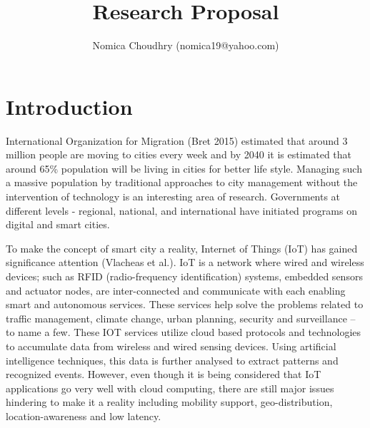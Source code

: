 \documentclass[10pt]{llncs}
\begin{document}
%
\title{Research Proposal}
%
\author{
Nomica Choudhry (\selectfont\ttfamily\upshape nomica19@yahoo.com)\\
}
\maketitle

%
\section{Introduction}
International Organization for Migration (Bret 2015) estimated that around 3 million people are moving to cities every week and by 2040 it is estimated that around 65\% population will be living in cities for better life style. Managing such a massive population by traditional approaches to city management without the intervention of technology is an interesting area of research. Governments at different levels - regional, national, and international have initiated programs on digital and smart cities.

To make the concept of smart city a reality, Internet of Things (IoT) has gained significance attention (Vlacheas et al.). IoT is a network where wired and wireless devices; such as RFID (radio-frequency identification) systems, embedded sensors and actuator nodes, are inter-connected and communicate with each enabling smart and autonomous services. These services help solve the problems related to traffic management, climate change, urban planning, security and surveillance – to name a few. These IOT services utilize cloud based protocols and technologies to accumulate data from wireless and wired sensing devices. Using artificial intelligence techniques, this data is further analysed to extract patterns and recognized events. However, even though it is being considered that IoT applications go very well with cloud computing, there are still major issues hindering to make it a reality including mobility support, geo-distribution, location-awareness and low latency. 
\end{document}
